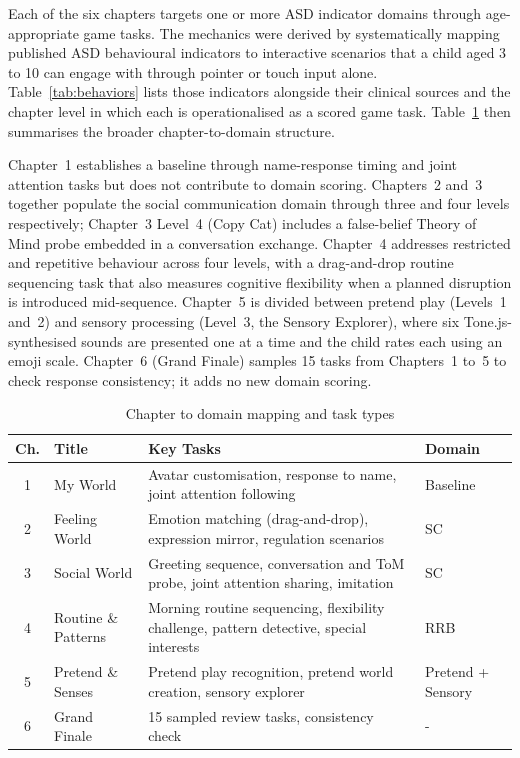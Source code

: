 \documentclass[12pt,a4paper,oneside]{report}
\begin{document}
	Each of the six chapters targets one or more ASD indicator domains through age-appropriate game tasks. The mechanics were derived by systematically mapping published ASD behavioural indicators to interactive scenarios that a child aged 3 to 10 can engage with through pointer or touch input alone. Table~\ref{tab:behaviors} lists those indicators alongside their clinical sources and the chapter level in which each is operationalised as a scored game task. Table~\ref{tab:chapters} then summarises the broader chapter-to-domain structure.
	
	Chapter~1 establishes a baseline through name-response timing and joint attention tasks but does not contribute to domain scoring. Chapters~2 and~3 together populate the social communication domain through three and four levels respectively; Chapter~3 Level~4 (Copy Cat) includes a false-belief Theory of Mind probe embedded in a conversation exchange. Chapter~4 addresses restricted and repetitive behaviour across four levels, with a drag-and-drop routine sequencing task that also measures cognitive flexibility when a planned disruption is introduced mid-sequence. Chapter~5 is divided between pretend play (Levels~1 and~2) and sensory processing (Level~3, the Sensory Explorer), where six Tone.js-synthesised sounds are presented one at a time and the child rates each using an emoji scale. Chapter~6 (Grand Finale) samples 15 tasks from Chapters~1 to~5 to check response consistency; it adds no new domain scoring.
	
	\begin{table}[H]
		\caption{Chapter to domain mapping and task types}
		\label{tab:chapters}
		\begin{tabularx}{\linewidth}{clXl}
			\toprule
			\textbf{Ch.} & \textbf{Title} & \textbf{Key Tasks} & \textbf{Domain} \\
			\midrule
			1 & My World            & Avatar customisation, response to name, joint attention following & Baseline \\
			2 & Feeling World       & Emotion matching (drag-and-drop), expression mirror, regulation scenarios & SC \\
			3 & Social World        & Greeting sequence, conversation and ToM probe, joint attention sharing, imitation & SC \\
			4 & Routine \& Patterns & Morning routine sequencing, flexibility challenge, pattern detective, special interests & RRB \\
			5 & Pretend \& Senses   & Pretend play recognition, pretend world creation, sensory explorer & Pretend + Sensory \\
			6 & Grand Finale        & 15 sampled review tasks, consistency check & - \\
			\bottomrule
		\end{tabularx}
	\end{table}
	
\end{document}
